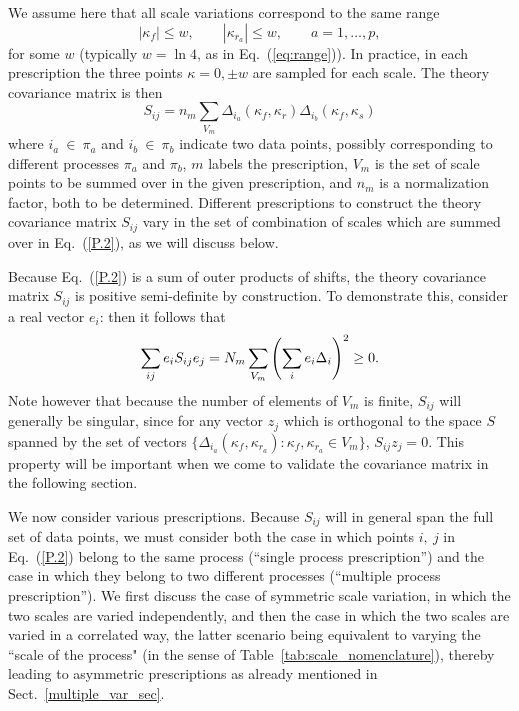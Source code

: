 We assume here that all scale variations correspond to the same range
\[
|\kappa_f| \leq w,\qquad |\kappa_{r_a}| \leq w,\qquad a=1,\ldots, p, \label{eq:rangew}
\] 
for some $w$ (typically $w = \ln 4$, as in Eq.~(\ref{eq:range})).
%
In practice, in each  prescription  the three points
$\kappa= 0, \pm w$ are sampled for each scale.
%
The theory covariance matrix is then
\begin{equation} \label{P.2}
  S_{ij} = n_m \sum_{V_m} \Delta_{i_a} (\kappa_f, \kappa_r) \Delta_{i_b} (\kappa_f, \kappa_s)
\end{equation}
where $i_a\ \in\ \pi_a$ and $i_b\ \in\ \pi_b$ indicate two data points,
possibly corresponding to different processes $\pi_a$ and $\pi_b$,
$m$ labels the
prescription, $V_m$ is the set of scale points to be summed over in
the given prescription, and $n_m$ is a normalization factor, both to
be determined.
%
Different prescriptions to construct the theory covariance matrix $S_{ij}$
vary in the set of  combination of scales which
are summed over in Eq.~(\ref{P.2}), as we will discuss below.

Because Eq.~(\ref{P.2}) is a sum of outer products of shifts, the theory
covariance matrix $S_{ij}$ is positive semi-definite by construction.
%
To demonstrate this, consider a real vector $e_i$: then it follows that 
 \begin{equation} \label{P.2pos}
 \sum_{ij} e_iS_{ij}e_j = N_m \sum_{V_m}  \left( \sum_i e_i\Delta_{i}\right)^2 \geq 0.
\end{equation}
Note however that because the number of elements of $V_m$ is finite,
$S_{ij}$ will generally be singular, since for any vector $z_j$ which
is orthogonal to the space $S$ spanned by the set of vectors
$\{\Delta_{i_a}(\kappa_f, \kappa_{r_a}): \kappa_f, \kappa_{r_a} \in V_m\}$,
$S_{ij}z_j=0$.
%
This property will be important when we come to validate the
covariance matrix in the following section.

We now consider various prescriptions.
%
Because $S_{ij}$ will in general span the full set of data points, we must
consider both the case in which points $i,\>j$ in Eq.~(\ref{P.2})
belong to the same process (``single process prescription'') and the
case in which they belong to two different processes  (``multiple
process prescription'').
%
We first discuss the case of symmetric scale
variation, in which the two scales are varied independently, and then
the case in  which the two scales are varied in a correlated way, the latter scenario being equivalent to varying the ``scale of the process" (in the sense of Table~\ref{tab:scale_nomenclature}), thereby
leading to asymmetric prescriptions as already mentioned in Sect.~\ref{multiple_var_sec}.
 
